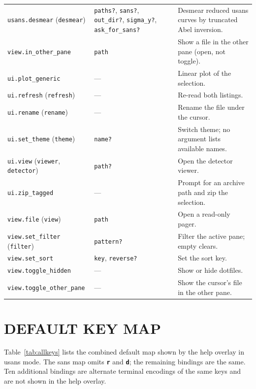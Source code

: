 \documentclass[tm]{ornltm}
\newcommand{\key}[1]{\textbf{\texttt{#1}}}
\begin{document}
\begin{small}
\begin{longtable}{p{} p{} p{}}
  \texttt{usans.desmear} (\texttt{desmear}) & \texttt{paths?},
    \texttt{sans?}, \texttt{out\_dir?}, \texttt{sigma\_y?},
    \texttt{ask\_for\_sans?} & Desmear
    reduced \ac{usans} curves by truncated Abel inversion. \\
  \texttt{view.in\_other\_pane} & \texttt{path} & Show a file in the other pane
    (open, not toggle). \\
  \texttt{ui.plot\_generic} & --- & Linear plot of the selection. \\
  \texttt{ui.refresh} (\texttt{refresh}) & --- & Re-read both listings. \\
  \texttt{ui.rename} (\texttt{rename}) & --- & Rename the file under the
    cursor. \\
  \texttt{ui.set\_theme} (\texttt{theme}) & \texttt{name?} & Switch theme; no
    argument lists available names. \\
  \texttt{ui.view} (\texttt{viewer}, \texttt{detector}) & \texttt{path?} &
    Open the detector viewer. \\
  \texttt{ui.zip\_tagged} & --- & Prompt for an archive path and zip the
    selection. \\
  \texttt{view.file} (\texttt{view}) & \texttt{path} & Open a read-only
    pager. \\
  \texttt{view.set\_filter} (\texttt{filter}) & \texttt{pattern?} & Filter the
    active pane; empty clears. \\
  \texttt{view.set\_sort} & \texttt{key}, \texttt{reverse?} & Set the sort
    key. \\
  \texttt{view.toggle\_hidden} & --- & Show or hide dotfiles. \\
  \texttt{view.toggle\_\allowbreak{}other\_pane} & --- & Show the cursor's file in the other
    pane. \\
\end{longtable}
\end{small}

\section{DEFAULT KEY MAP}
\label{sec:appkeys}

Table~\ref{tab:allkeys} lists the combined default map shown by the help overlay
in \ac{usans} mode. The \ac{sans} map omits \key{r} and \key{d}; the remaining
bindings are the same. Ten additional bindings are alternate terminal encodings
of the same keys and are not shown in the help overlay.
\end{document}
